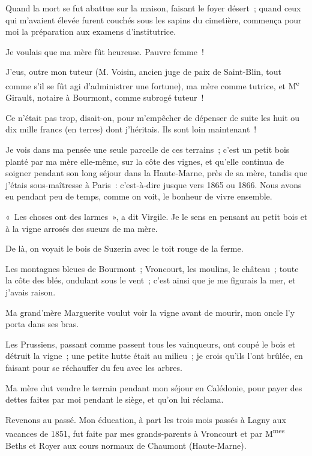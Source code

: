 \documentclass[french,twoside]{book} %
\newcommand\chaptercont{} %
\begin{document}
\chaptercont
\noindent Quand la mort se fut abattue sur la maison, faisant le foyer désert ; quand ceux qui m’avaient élevée furent couchés sous les sapins du cimetière, commença pour moi la préparation aux examens d’institutrice.\par
Je voulais que ma mère fût heureuse. Pauvre femme !\par
J’eus, outre mon tuteur (M. Voisin, ancien juge de paix de Saint-Blin, tout comme s’il se fût agi d’administrer une fortune), ma mère comme tutrice, et M\textsuperscript{e} Girault, notaire à Bourmont, comme subrogé tuteur !\par
Ce n’était pas trop, disait-on, pour m’empêcher de dépenser de suite les huit ou dix mille francs (en terres) dont j’héritais. Ils sont loin maintenant !\par
Je vois dans ma pensée une seule parcelle de ces terrains ; c’est un petit bois planté par ma mère elle-même, sur la côte des vignes, et qu’elle  continua de soigner pendant son long séjour dans la Haute-Marne, près de sa mère, tandis que j’étais sous-maîtresse à Paris : c’est-à-dire jusque vers 1865 ou 1866. Nous avons eu pendant peu de temps, comme on voit, le bonheur de vivre ensemble.\par
« Les choses ont des larmes », a dit Virgile. Je le sens en pensant au petit bois et à la vigne arrosés des sueurs de ma mère.\par
De là, on voyait le bois de Suzerin avec le toit rouge de la ferme.\par
Les montagnes bleues de Bourmont ; Vroncourt, les moulins, le château ; toute la côte des blés, ondulant sous le vent ; c’est ainsi que je me figurais la mer, et j’avais raison.\par
Ma grand’mère Marguerite voulut voir la vigne avant de mourir, mon oncle l’y porta dans ses bras.\par
Les Prussiens, passant comme passent tous les vainqueurs, ont coupé le bois et détruit la vigne ; une petite hutte était au milieu ; je crois qu’ils l’ont brûlée, en faisant pour se réchauffer du feu avec les arbres.\par
Ma mère dut vendre le terrain pendant mon séjour en Calédonie, pour payer des dettes faites par moi pendant le siège, et qu’on lui réclama.\par
Revenons au passé. Mon éducation, à part  les trois mois passés à Lagny aux vacances de 1851, fut faite par mes grands-parents à Vroncourt et par M\textsuperscript{mes} Beths et Royer aux cours normaux de Chaumont (Haute-Marne).\par
\end{document}
